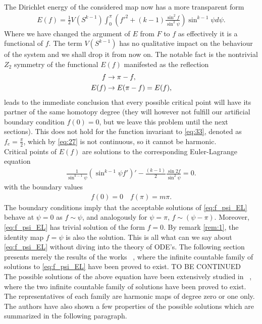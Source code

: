 The Dirichlet energy of the considered map now has a more transparent
form
\begin{align}
  \label{eq:En_Sk}
  E(f)=\frac{1}{2} V(S^{k-1})\int_{0}^{\pi}
  \left(f'^2+(k-1)\frac{\sin^2f}{\sin^2\psi}\right) \sin^{k-1}\psi
  d\psi.
\end{align}
Where we have changed the argument of $E$ from $F$ to $f$ as
effectively it is a functional of $f$. The term $V(S^{k-1})$ has no
qualitative impact on the behaviour of the system and we shall drop it
from now on. The notable fact is the nontrivial $Z_2$ symmetry of the
functional $E(f)$ manifested as the reflection
\begin{align}
  \label{eq:33}
  f&\rightarrow\pi-f,\\
  E(f)&\rightarrow E(\pi-f)=E(f),
\end{align}
leads to the immediate conclusion that every possible critical point
will have its partner of the same homotopy degree (they will however
not fulfill our artificial boundary condition $f(0)=0$, but we leave
this problem until the next sections). This does not hold for the
function invariant to \eqref{eq:33}, denoted as $f_e=\frac{\pi}{2}$,
which by \eqref{eq:27} is not continuous, so it
cannot be harmonic.\\

Critical points of $E(f)$ are solutions to the corresponding
Euler-Lagrange equation
\begin{align}
  \label{eq:f_psi_EL}
  \frac{1}{\sin^{k-1}\psi}\left(\sin^{k-1}\psi f'\right)'-\frac{(k-1)}{2}\frac{\sin2f}{\sin^2\psi}=0.
\end{align}
with the boundary values
\begin{align}
  \label{eq:32}
  f(0)=0\quad f(\pi)=m\pi.
\end{align}
The boundary conditions imply that the acceptable solutions of
\eqref{eq:f_psi_EL} behave at $\psi=0$ as $f\sim\psi$, and analogously
for $\psi=\pi$, $f\sim(\psi-\pi)$. Moreover, \eqref{eq:f_psi_EL} has
trivial solution of the form $f=0$. By remark \ref{rem:1}, the
identity map $f=\psi$ is also the solution. This is all what can we
say about \eqref{eq:f_psi_EL} without diving into the theory of
ODE's. The following section presents merely the results of the works
~\cite{Corlette2001,Bizon1997}, where the infinite countable family of
solutions to \eqref{eq:f_psi_EL} have been proved to exist. TO BE CONTINUED\\


The possible solutions of the above equation have been extensively
studied in ~\cite{Corlette2001,Bizon1997}, where the two infinite
countable family of solutions have been proved to exist. The
representatives of each family are harmonic maps of degree zero or one
only. The authors have also shown a few properties of the possible
solutions which are summarized in the following paragraph.

